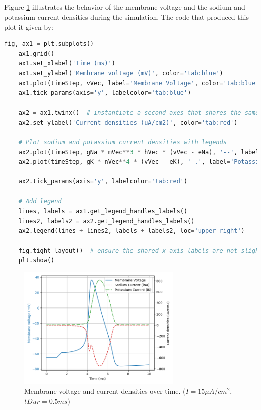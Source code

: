\documentclass{article}
\begin{document}
    \subsection{}

    Figure \ref{fig:membrane_voltage_currents} illustrates the behavior of the membrane voltage and the sodium and potassium current densities during the simulation.
    The code that produced this plot it given by:

    \begin{lstlisting}[language=Python, style=mystyle]
    fig, ax1 = plt.subplots()
    ax1.grid()
    ax1.set_xlabel('Time (ms)')
    ax1.set_ylabel('Membrane voltage (mV)', color='tab:blue')
    ax1.plot(timeStep, vVec, label='Membrane Voltage', color='tab:blue')
    ax1.tick_params(axis='y', labelcolor='tab:blue')

    ax2 = ax1.twinx()  # instantiate a second axes that shares the same x-axis
    ax2.set_ylabel('Current densities (uA/cm2)', color='tab:red')

    # Plot sodium and potassium current densities with legends
    ax2.plot(timeStep, gNa * mVec**3 * hVec * (vVec - eNa), '--', label='Sodium Current (iNa)', color='tab:red')
    ax2.plot(timeStep, gK * nVec**4 * (vVec - eK), '-.', label='Potassium Current (iK)', color='tab:green')

    ax2.tick_params(axis='y', labelcolor='tab:red')

    # Add legend
    lines, labels = ax1.get_legend_handles_labels()
    lines2, labels2 = ax2.get_legend_handles_labels()
    ax2.legend(lines + lines2, labels + labels2, loc='upper right')

    fig.tight_layout()  # ensure the shared x-axis labels are not slightly cut off
    plt.show()
    \end{lstlisting}

    \begin{figure}[h]
        \centering
        \includegraphics[width=0.7\textwidth]{channel_activation.png}
        \caption{Membrane voltage and current densities over time. ($I = 15 \mu A/cm^2$, $tDur = 0.5 ms$)}
        \label{fig:membrane_voltage_currents}
    \end{figure}
\end{document}
